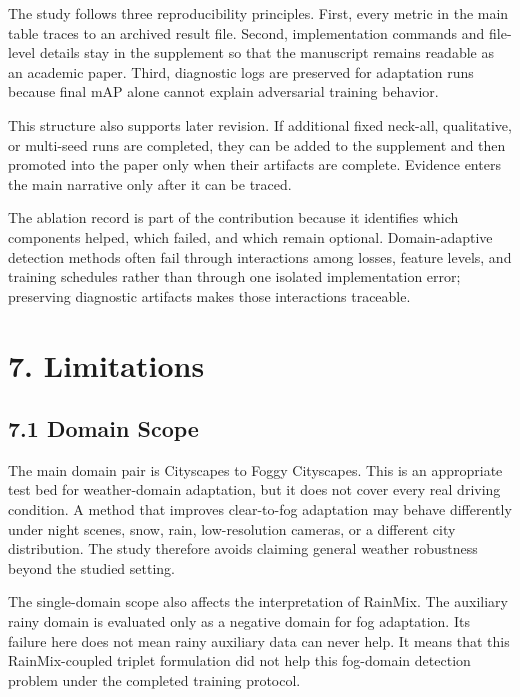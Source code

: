 \documentclass[
  11pt,
]{article}
\begin{document}
The study follows three reproducibility principles. First, every metric
in the main table traces to an archived result file. Second,
implementation commands and file-level details stay in the supplement so
that the manuscript remains readable as an academic paper. Third,
diagnostic logs are preserved for adaptation runs because final mAP
alone cannot explain adversarial training behavior.

This structure also supports later revision. If additional fixed
neck-all, qualitative, or multi-seed runs are completed, they can be
added to the supplement and then promoted into the paper only when their
artifacts are complete. Evidence enters the main narrative only after it
can be traced.

The ablation record is part of the contribution because it identifies
which components helped, which failed, and which remain optional.
Domain-adaptive detection methods often fail through interactions among
losses, feature levels, and training schedules rather than through one
isolated implementation error; preserving diagnostic artifacts makes
those interactions traceable.

\hypertarget{limitations}{%
\section{7. Limitations}\label{limitations}}

\hypertarget{domain-scope}{%
\subsection{7.1 Domain Scope}\label{domain-scope}}

The main domain pair is Cityscapes to Foggy Cityscapes. This is an
appropriate test bed for weather-domain adaptation, but it does not
cover every real driving condition. A method that improves clear-to-fog
adaptation may behave differently under night scenes, snow, rain,
low-resolution cameras, or a different city distribution. The study
therefore avoids claiming general weather robustness beyond the studied
setting.

The single-domain scope also affects the interpretation of RainMix. The
auxiliary rainy domain is evaluated only as a negative domain for fog
adaptation. Its failure here does not mean rainy auxiliary data can
never help. It means that this RainMix-coupled triplet formulation did
not help this fog-domain detection problem under the completed training
protocol.
\end{document}
